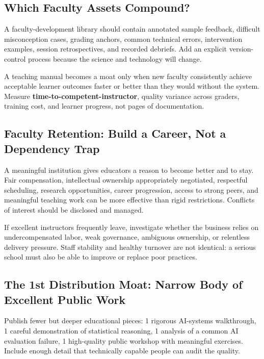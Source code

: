 \subsection{Which Faculty Assets Compound?}
\label{sec:which_faculty_assets_compound}

A faculty-development library should contain annotated sample feedback, difficult misconception cases, grading anchors, common technical errors, intervention examples, session retrospectives, and recorded debriefs. Add an explicit version-control process because the science and technology will change.

A teaching manual becomes a moat only when new faculty consistently achieve acceptable learner outcomes faster or better than they would without the system. Measure \textbf{time-to-competent-instructor}, quality variance across graders, training cost, and learner progress, not pages of documentation.

\subsection{Faculty Retention: Build a Career, Not a Dependency Trap}
\label{sec:faculty_retention_career_not_trap}

A meaningful institution gives educators a reason to become better and to stay. Fair compensation, intellectual ownership appropriately negotiated, respectful scheduling, research opportunities, career progression, access to strong peers, and meaningful teaching work can be more effective than rigid restrictions. Conflicts of interest should be disclosed and managed.

If excellent instructors frequently leave, investigate whether the business relies on undercompensated labor, weak governance, ambiguous ownership, or relentless delivery pressure. Staff stability and healthy turnover are not identical: a serious school must also be able to improve or replace poor practices.

\subsection{The 1st Distribution Moat: Narrow Body of Excellent Public Work}
\label{sec:first_distribution_moat_public_work}

Publish fewer but deeper educational pieces: 1 rigorous AI-systems walkthrough, 1 careful demonstration of statistical reasoning, 1 analysis of a common AI evaluation failure, 1 high-quality public workshop with meaningful exercises. Include enough detail that technically capable people can audit the quality.

